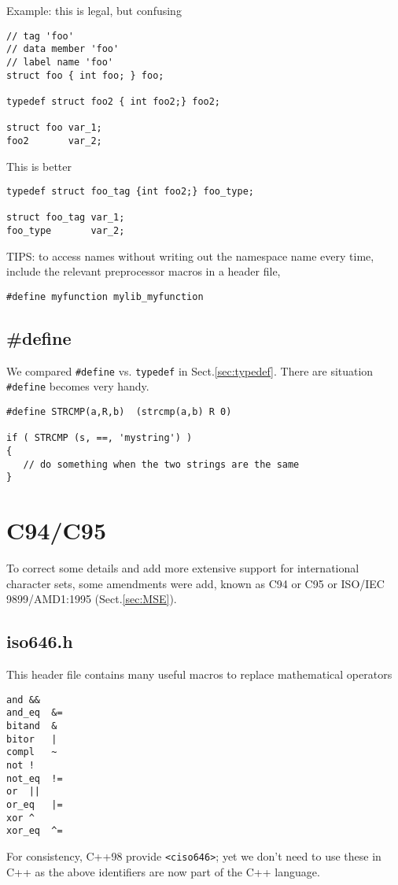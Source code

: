 Example: this is legal, but confusing
\begin{verbatim}
// tag 'foo'
// data member 'foo'
// label name 'foo'
struct foo { int foo; } foo;

typedef struct foo2 { int foo2;} foo2;

struct foo var_1;
foo2       var_2;
\end{verbatim}

This is better
\begin{verbatim}
typedef struct foo_tag {int foo2;} foo_type;

struct foo_tag var_1;
foo_type       var_2;
\end{verbatim}

TIPS: to access names without writing out the namespace name every time, include
the relevant preprocessor macros in a header file,
\begin{verbatim}
#define myfunction mylib_myfunction
\end{verbatim}

\subsection{\#define}
\label{sec:define}

We compared \verb!#define! vs. \verb!typedef! in Sect.\ref{sec:typedef}. There
are situation \verb!#define! becomes very handy.

\begin{verbatim}
#define STRCMP(a,R,b)  (strcmp(a,b) R 0)

if ( STRCMP (s, ==, 'mystring') ) 
{
   // do something when the two strings are the same
}
\end{verbatim}

\section{C94/C95}
\label{sec:C95}

To correct some details and add more extensive support for international
character sets, some amendments were add, known as C94 or C95 or ISO/IEC
9899/AMD1:1995 (Sect.\ref{sec:MSE}).


\subsection{iso646.h}
\label{sec:iso646.h}

This header file contains many useful macros to replace mathematical operators
\begin{Verbatim}
and	&&
and_eq	&=
bitand	&
bitor	|
compl	~
not	!
not_eq	!=
or	||
or_eq	|=
xor	^
xor_eq	^=
\end{Verbatim}
For consistency, C++98 provide \verb!<ciso646>!; yet we don't need to use these
in C++ as the above identifiers are now part of the C++ language.

